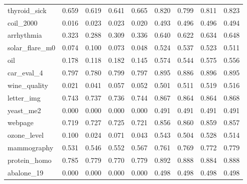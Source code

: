 \begin{figure}[ht]
\begin{tabular}{l*{8}{c}}
        thyroid\_sick&0.659&0.619&0.641&0.665&0.820&0.799&0.811&0.823\\
        coil\_2000&0.016&0.023&0.023&0.020&0.493&0.496&0.496&0.494\\
        arrhythmia&0.323&0.288&0.309&0.336&0.640&0.622&0.634&0.648\\
        solar\_flare\_m0&0.074&0.100&0.073&0.048&0.524&0.537&0.523&0.511\\
        oil&0.178&0.118&0.182&0.145&0.574&0.544&0.575&0.556\\
        car\_eval\_4&0.797&0.780&0.799&0.797&0.895&0.886&0.896&0.895\\
        wine\_quality&0.021&0.041&0.057&0.052&0.501&0.511&0.519&0.516\\
        letter\_img&0.743&0.737&0.736&0.744&0.867&0.864&0.864&0.868\\
        yeast\_me2&0.000&0.000&0.000&0.000&0.491&0.491&0.491&0.491\\
        webpage&0.719&0.727&0.725&0.721&0.856&0.860&0.859&0.857\\
        ozone\_level&0.100&0.024&0.071&0.043&0.543&0.504&0.528&0.514\\
        mammography&0.531&0.546&0.552&0.567&0.761&0.769&0.772&0.779\\
        protein\_homo&0.785&0.779&0.770&0.779&0.892&0.888&0.884&0.888\\
        abalone\_19&0.000&0.000&0.000&0.000&0.498&0.498&0.498&0.498\\
    \end{tabular}
\end{figure}

